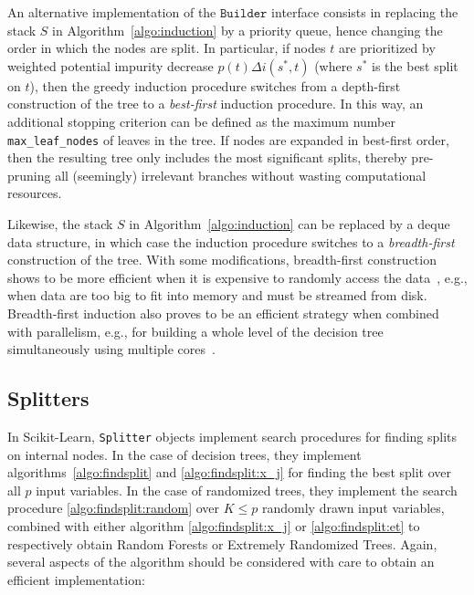 An alternative implementation of the $\texttt{Builder}$ interface consists in
replacing the stack $S$ in Algorithm~\ref{algo:induction} by a priority queue,
hence changing the order in which the nodes are split. In particular, if nodes
$t$ are prioritized by weighted potential impurity decrease $p(t) \Delta
i(s^*,t)$ (where $s^*$ is the best split on $t$), then the greedy induction
procedure switches from a depth-first construction of the tree to a \textit
{best-first} induction procedure. In this way, an additional stopping criterion
can be defined as the maximum number \texttt{max\_leaf\_nodes} of leaves in the
tree. If nodes are expanded in best-first order, then the resulting tree only
includes the most significant splits, thereby pre-pruning all (seemingly)
irrelevant branches without wasting computational resources.

Likewise,  the stack $S$ in Algorithm~\ref{algo:induction} can be replaced by a
deque data structure, in which case the induction procedure switches to a
\textit{breadth-first} construction of the tree. With some modifications,
breadth-first construction shows to be more efficient when it is expensive to
randomly access the data~\citep{criminisi:2013}, e.g., when data are too big to
fit into memory and must be streamed from disk. Breadth-first induction also
proves to be an efficient strategy when combined with parallelism, e.g., for
building a whole level of the decision tree simultaneously using multiple
cores~\citep{liao:2013}.

\subsection{Splitters}

In Scikit-Learn, \texttt{Splitter} objects implement search procedures for
finding splits on internal nodes. In the case of decision trees, they implement
algorithms~\ref{algo:findsplit} and \ref{algo:findsplit:x_j} for finding the
best split over all $p$ input variables. In the case of randomized trees, they
implement the search procedure \ref{algo:findsplit:random} over $K \leq p$
randomly drawn input variables, combined with either algorithm
\ref{algo:findsplit:x_j} or  \ref{algo:findsplit:et} to respectively obtain
Random Forests or Extremely Randomized Trees. Again, several aspects of the
algorithm should be considered with care to obtain an efficient implementation:

